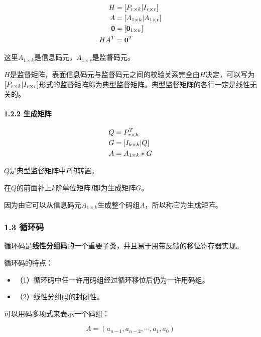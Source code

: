 \documentclass[
]{article}
\begin{document}
\begin{align}
H &= [P_{r \times k} \space | \space I_{r \times r}]\\
A &= [A_{1 \times k} \space | \space A_{1 \times r}]\\
\boldsymbol0 &= [\boldsymbol0_{1 \times n}]\\
HA^T &= \boldsymbol0^T \\
\end{align}

这里$A_{1 \times k}$是信息码元，$A_{1 \times r}$是监督码元。

$H$是监督矩阵，表面信息码元与监督码元之间的校验关系完全由$H$决定，可以写为$[P_{r \times k} \space | \space I_{r \times r}]$形式的监督矩阵称为典型监督矩阵。典型监督矩阵的各行一定是线性无关的。

\hypertarget{header-n20}{%
\paragraph{1.2.2 生成矩阵}\label{header-n20}}

\begin{align}
Q &= P_{r \times k}^T\\
G &= [I_{k \times k} \space | \space Q]\\
A &= A_{1 \times k}*G\\
\end{align}

$Q$是典型监督矩阵中$P$的转置。

在$Q$的前面补上$k$阶单位矩阵$I$即为生成矩阵$G$。

因为由它可以从信息码元$A_{1 \times k}$生成整个码组$A$，所以称它为生成矩阵。

\hypertarget{header-n25}{%
\subsubsection{1.3 循环码}\label{header-n25}}

循环码是\textbf{线性分组码}的一个重要子类，并且易于用带反馈的移位寄存器实现。

循环码的特点：

\begin{itemize}
\item
  （1）循环码中任一许用码组经过循环移位后仍为一许用码组。
\item
  （2）线性分组码的封闭性。
\end{itemize}

可以用码多项式来表示一个码组：

$$
A = (a_{n-1},a_{n-2},\cdots,a_{1},a_{0})
$$
\end{document}
